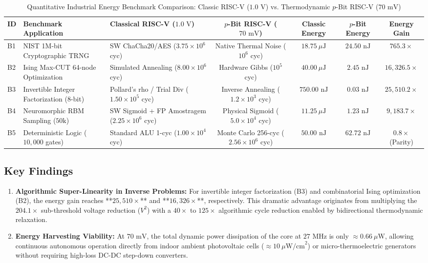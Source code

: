 \documentclass[journal,10pt,twocolumn]{IEEEtran}
\begin{document}
\begin{table}[t]
\centering
\caption{Quantitative Industrial Energy Benchmark Comparison: Classic RISC-V ($1.0\text{ V}$) vs. Thermodynamic $p$-Bit RISC-V ($70\text{ mV}$)}
\label{tab:energy_comparison}
\begin{tabular}{lllcccc}
\toprule
\textbf{ID} & \textbf{Benchmark Application} & \textbf{Classical RISC-V ($1.0\text{ V}$)} & \textbf{$p$-Bit RISC-V ($70\text{ mV}$)} & \textbf{Classic Energy} & \textbf{$p$-Bit Energy} & \textbf{Energy Gain} \\
\midrule
B1 & NIST 1M-bit Cryptographic TRNG & SW ChaCha20/AES ($3.75\times 10^6$ cyc) & Native Thermal Noise ($10^6$ cyc) & $18.75\ \mu\text{J}$ & \textbf{$24.50\text{ nJ}$} & \textbf{$765.3\times$} \\
B2 & Ising Max-CUT 64-node Optimization & Simulated Annealing ($8.00\times 10^6$ cyc) & Hardware Gibbs ($10^5$ cyc) & $40.00\ \mu\text{J}$ & \textbf{$2.45\text{ nJ}$} & \textbf{$16,326.5\times$} \\
B3 & Invertible Integer Factorization (8-bit) & Pollard's rho / Trial Div ($1.50\times 10^5$ cyc) & Inverse Annealing ($1.2\times 10^3$ cyc) & $750.00\text{ nJ}$ & \textbf{$0.03\text{ nJ}$} & \textbf{$25,510.2\times$} \\
B4 & Neuromorphic RBM Sampling ($50\text{k}$) & SW Sigmoid + FP Amostragem ($2.25\times 10^6$ cyc) & Physical Sigmoid ($5.0\times 10^4$ cyc) & $11.25\ \mu\text{J}$ & \textbf{$1.23\text{ nJ}$} & \textbf{$9,183.7\times$} \\
B5 & Deterministic Logic ($10,000$ gates) & Standard ALU 1-cyc ($1.00\times 10^4$ cyc) & Monte Carlo 256-cyc ($2.56\times 10^6$ cyc) & $50.00\text{ nJ}$ & \textbf{$62.72\text{ nJ}$} & $0.8\times$ (Parity) \\
\bottomrule
\end{tabular}
\end{table}

\subsection{Key Findings}
\begin{enumerate}
    \item \textbf{Algorithmic Super-Linearity in Inverse Problems:} For invertible integer factorization (B3) and combinatorial Ising optimization (B2), the energy gain reaches **$25,510\times$** and **$16,326\times$**, respectively. This dramatic advantage originates from multiplying the $204.1\times$ sub-threshold voltage reduction ($V^2$) with a $40\times$ to $125\times$ algorithmic cycle reduction enabled by bidirectional thermodynamic relaxation.
    \item \textbf{Energy Harvesting Viability:} At $70\text{ mV}$, the total dynamic power dissipation of the core at $27\text{ MHz}$ is only $\approx 0.66\ \mu\text{W}$, allowing continuous autonomous operation directly from indoor ambient photovoltaic cells ($\approx 10\ \mu\text{W/cm}^2$) or micro-thermoelectric generators without requiring high-loss DC-DC step-down converters.
\end{enumerate}
\end{document}
